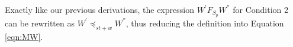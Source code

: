 \documentclass[acmlarge, ,11pt]{acmart}
\begin{document}
 Exactly like our previous derivations, the expression $W^{'}  F_{S_p} W^{''}$ for Condition 2  can be rewritten as  $W^{'}  \preccurlyeq_{\mathit{st}+w} W^{''}$,  thus reducing the definition into Equation \ref{eqn:MW}.
\end{document}
